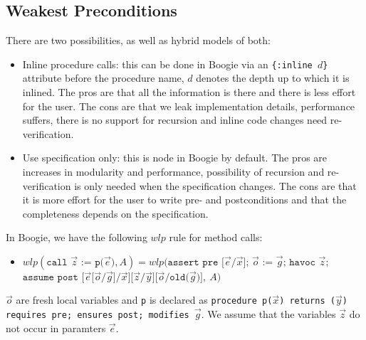 \subsection{Weakest Preconditions}
\begin{mytitle} There are two possibilities, as well as hybrid models of both:
\begin{itemize}
    \item Inline procedure calls: this can be done in Boogie via an \texttt{\{:inline $d$\}} attribute before the procedure name, $d$ denotes the depth up to which it is inlined. The pros are that all the information is there and there is less effort for the user. The cons are that we leak implementation details, performance suffers, there is no support for recursion and inline code changes need re-verification.
    \item Use specification only: this is node in Boogie by default. The pros are increases in modularity and performance, possibility of recursion and re-verification is only needed when the specification changes. The cons are that it is more effort for the user to write pre- and postconditions and that the completeness depends on the specification.
\end{itemize}
\end{mytitle}
\begin{mytitle} In Boogie, we have the following $wlp$ rule for method calls: 
\begin{itemize}
    \item $wlp(\texttt{call $\vec{z}$ := p($\vec{e}$)}, A) = wlp(\texttt{assert pre [$\vec{e}$/$\vec{x}$]; $\vec{o}$ := $\vec{g}$; havoc $\vec{z}$;}$ \\
    $\texttt{assume post [$\vec{e}$[$\vec{o}$/$\vec{g}$]/$\vec{x}$][$\vec{z}$/$\vec{y}$][$\vec{o}$/old($\vec{g}$)]},\ A)$
\end{itemize}
$\vec{o}$ are fresh local variables and \texttt{p} is declared as \texttt{procedure p($\vec{x}$) returns ($\vec{y}$) requires pre; ensures post; modifies $\vec{g}$}. We assume that the variables $\vec{z}$ do not occur in paramters $\vec{e}$.
\end{mytitle}


